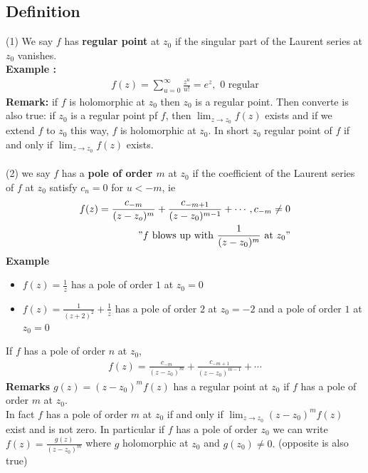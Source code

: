 \subsection{Definition}

(1) We say $f$ has \textbf{regular point} at $z_0$ if the singular part of the Laurent series at $z_0$ vanishes. \\
\textbf{Example :}
\begin{align*}
    f(z) = \sum_{u=0}^\infty \frac{z^u}{u!} = e^z, \text{ 0 regular}
\end{align*}
\textbf{Remark: } if $f$ is holomorphic at $z_0$ then $z_0$ is a regular point. Then converte is also true: if $z_0$ is a regular point pf $f$, then $\lim_{z \rightarrow z_0} f(z)$ exists and if we extend $f$ to $z_0$ this way, $f$ is holomorphic at $z_0$. In short $z_0$ regular point of $f$ if and only if $\lim_{z \rightarrow z_0} f(z)$ exists. \\ \\
(2) we say $f$ has a \textbf{pole of order $m$} at $z_0$ if the coefficient of the Laurent series of $f$ at $z_0$ satisfy $c_n = 0$ for $u < -m$, ie
\begin{align*}
    f(z) = \frac{c_{-m}}{(z-z_o)^m} + \frac{c_{-m+1}}{(z-z_0)^{m-1}} + \cdots, c_{-m} \neq 0 \\
    "f \text{ blows up with } \frac{1}{(z-z_0)^m } \text{ at } z_0"
\end{align*}
\textbf{Example}
\begin{itemize}
\item $f(z) = \frac{1}{z}$ has a pole of order $1$ at $z_0 = 0$
\item $f(z) = \frac{1}{(z + 2)^2} + \frac{1}{z}$ has a pole of order $2$ at $z_0 = -2$ and a pole of order $1$ at $z_0 = 0$
\end{itemize}
If $f$ has a pole of order $n$ at $z_0$, 
\begin{align*}
    f(z) = \frac{c_{-m}}{(z-z_0)^m} + \frac{c_{-m+1}}{(z-z_0)^{m-1}} + \cdots
\end{align*}
\textbf{Remarks} $g(z) = (z-z_0)^mf(z)$ has a regular point at $z_0$ if $f$ has a pole of order $m$ at $z_0$. \\
In fact $f$ has a pole of order $m$ at $z_0$ if and only if $\lim_{z \rightarrow z_0}(z-z_0)^mf(z)$ exist and is not zero. In particular if $f$ has a pole of order $z_0$ we can write $f(z) = \frac{g(z)}{(z-z_0)^m}$ where $g$ holomorphic at $z_0$ and $g(z_0) \neq 0.$ (opposite is also true) \\ \\
